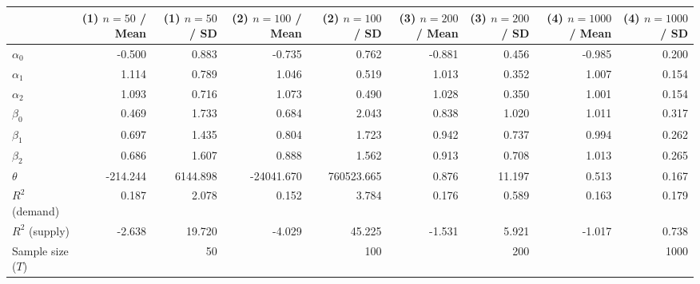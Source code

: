 
\begin{tabular}[t]{lrrrrrrrr}
\toprule
  & (1) $n=50$ / Mean & (1) $n=50$ / SD & (2) $n=100$ / Mean & (2) $n=100$ / SD & (3) $n=200$ / Mean & (3) $n=200$ / SD & (4) $n=1000$ / Mean & (4) $n=1000$ / SD\\
\midrule
$\alpha_{0}$ & -0.500 & 0.883 & -0.735 & 0.762 & -0.881 & 0.456 & -0.985 & 0.200\\
$\alpha_{1}$ & 1.114 & 0.789 & 1.046 & 0.519 & 1.013 & 0.352 & 1.007 & 0.154\\
$\alpha_{2}$ & 1.093 & 0.716 & 1.073 & 0.490 & 1.028 & 0.350 & 1.001 & 0.154\\
$\beta_{0}$ & 0.469 & 1.733 & 0.684 & 2.043 & 0.838 & 1.020 & 1.011 & 0.317\\
$\beta_{1}$ & 0.697 & 1.435 & 0.804 & 1.723 & 0.942 & 0.737 & 0.994 & 0.262\\
$\beta_{2}$ & 0.686 & 1.607 & 0.888 & 1.562 & 0.913 & 0.708 & 1.013 & 0.265\\
$\theta$ & -214.244 & 6144.898 & -24041.670 & 760523.665 & 0.876 & 11.197 & 0.513 & 0.167\\
$R^{2}$ (demand) & 0.187 & 2.078 & 0.152 & 3.784 & 0.176 & 0.589 & 0.163 & 0.179\\
$R^{2}$ (supply) & -2.638 & 19.720 & -4.029 & 45.225 & -1.531 & 5.921 & -1.017 & 0.738\\
Sample size ($T$) &  & 50 &  & 100 &  & 200 &  & 1000\\
\bottomrule
\end{tabular}

